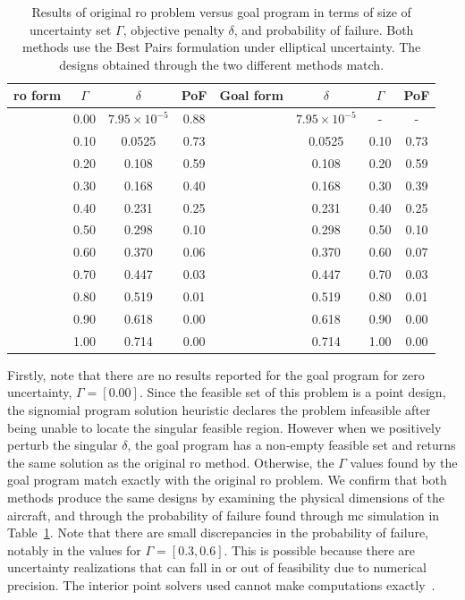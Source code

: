 \begin{table}
\begin{center}
\caption{\label{tab:deltaVsGamma} Results of original \gls{ro} problem versus goal program in terms
of size of uncertainty set $\Gamma$, objective penalty $\delta$, and probability of failure. Both methods
use the Best Pairs formulation under elliptical uncertainty. The designs obtained through
the two different methods match.}
\begin{tabular}{c c c c c c c c}
\hline
 \gls{ro} form & $\Gamma$ & $\delta$ & PoF & Goal form & $\delta$ & $\Gamma$ & PoF\\
\hline
& 0.00 & $7.95 \times 10^{-5}$ & 0.88 & & $7.95 \times 10^{-5}$ & - & - \\
& 0.10 & 0.0525 & 0.73 & & 0.0525 & 0.10 & 0.73 \\
& 0.20 & 0.108 & 0.59 & & 0.108 & 0.20 & 0.59 \\
& 0.30 & 0.168 & 0.40 & & 0.168 & 0.30 & 0.39 \\
& 0.40 & 0.231 & 0.25 & & 0.231 & 0.40 & 0.25 \\
& 0.50 & 0.298 & 0.10 & & 0.298 & 0.50 & 0.10 \\
& 0.60 & 0.370 & 0.06 & & 0.370 & 0.60 & 0.07 \\
& 0.70 & 0.447 & 0.03 & & 0.447 & 0.70 & 0.03 \\
& 0.80 & 0.519 & 0.01 & & 0.519 & 0.80 & 0.01 \\
& 0.90 & 0.618 & 0.00 & & 0.618 & 0.90 & 0.00 \\
& 1.00 & 0.714 & 0.00 & & 0.714 & 1.00 & 0.00 \\
\end{tabular}
\end{center}
\end{table}

Firstly, note that there are no results reported for the goal program
for zero uncertainty, $\Gamma = [0.00]$.
Since the feasible set of this problem is a point design, the signomial program
solution heuristic declares the problem infeasible after being
unable to locate the singular feasible region. However when we positively perturb
the singular $\delta$, the goal program has a non-empty feasible set and
returns the same solution as the original \gls{ro} method.
Otherwise, the $\Gamma$ values found by the goal program match exactly
with the original \gls{ro} problem. We confirm that both methods produce
the same designs by examining the physical dimensions of the aircraft, and through the probability
of failure found through \gls{mc} simulation in Table~\ref{tab:deltaVsGamma}.
Note that there are small discrepancies
in the probability of failure, notably in the values for $\Gamma = [0.3, 0.6]$. This is
possible because there are uncertainty realizations that can fall
in or out of feasibility due to numerical precision. The interior point solvers
used cannot make computations exactly~\cite{Nesterov1994}.

